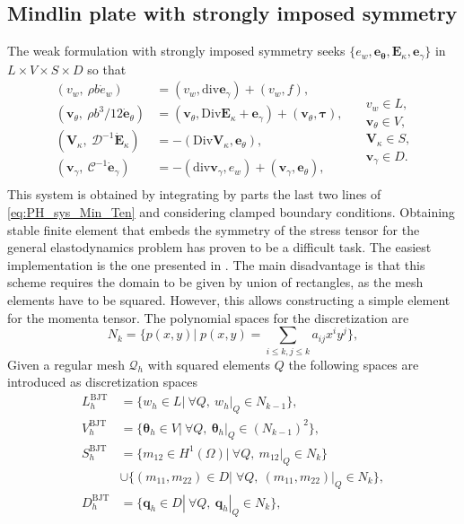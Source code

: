 \documentclass{ifacconf}
\begin{document}
\subsection{Mindlin plate with strongly imposed symmetry}

The weak formulation with strongly imposed symmetry seeks $\{e_w, \bm{e}_{\bm{\theta}}, \bm{E}_{\kappa}, \bm{e}_{\gamma}\}$ in $L \times V \times S \times D$ so that 
\begin{equation}
\label{eq:weak_min_PH_strong}
\begin{aligned}
(v_w, \ \rho b \dot{e}_w) &= (v_w, \mathrm{div} \bm{e}_\gamma) + (v_w, f), \\ 
(\bm{v}_\theta, \ \rho b^3/12  \dot{\bm{e}}_\theta) &= (\bm{v}_\theta, \mathrm{Div} \bm{E}_\kappa + \bm{e}_\gamma) + (\bm{v}_\theta, \bm{\tau}), \\  
(\bm{V}_\kappa, \ \mathcal{D}^{-1} \dot{\bm{E}}_\kappa) &= -(\mathrm{Div} \bm{V}_\kappa,  \bm{e}_\theta), \\ 
(\bm{v}_\gamma, \ \mathcal{C}^{-1} \dot{\bm{e}}_\gamma) &= -(\mathrm{div} \bm{v}_\gamma, e_w ) + (\bm{v}_\gamma, \bm{e}_{\theta}), \\ 
\end{aligned} \quad
\begin{aligned}
v_w \in L, \\
\bm{v}_\theta \in V, \\
\bm{V}_\kappa \in S, \\
\bm{v}_\gamma \in D.
\end{aligned}
\end{equation}
This system is obtained by integrating by parts the last two lines of \eqref{eq:PH_sys_Min_Ten} and considering clamped boundary conditions. Obtaining stable finite element that embeds the symmetry of the stress tensor for the general elastodynamics problem has proven to be a difficult task. The easiest implementation is the one presented in \cite{becacheWave,becacheElas}. The main disadvantage is that this scheme requires the domain to be given by union of rectangles, as the mesh elements have to be squared. However, this allows constructing a simple element for the momenta tensor. The polynomial spaces for the discretization are
\[
N_{k} = \{p(x, y)| \; p(x, y) = \sum_{i\le k, j\le k} a_{ij} x^i y^j  \},
\]
Given a regular mesh $\mathcal{Q}_h$ with squared elements $Q$ the following spaces are introduced as discretization spaces
\begin{equation}
\label{eq:BTJ}
	\begin{aligned}
	L_h^{\text{BJT}} &= \{w_h \in L | \ \forall Q, \ w_h|_{Q} \in N_{k-1} \}, \\
	V_h^{\text{BJT}} &= \{\bm{\theta}_h \in V | \ \forall Q,\ \bm{\theta}_h|_{Q} \in (N_{k-1})^2 \}, \\
	S_h^{\text{BJT}} &= \{m_{12} \in H^1(\Omega)| \ \forall Q,\ m_{12}|_{Q} \in N_{k} \}  \\
	&\cup \{(m_{11}, m_{22}) \in D| \; \forall Q,\ (m_{11}, m_{22})|_{Q} \in N_{k} \}, \\
	D_h^{\text{BJT}} &= \{\bm{q}_h \in D | \ \forall Q,\ \bm{q}_h|_{Q} \in N_{k} \}, \\ 
	\end{aligned}
\end{equation}
\end{document}
